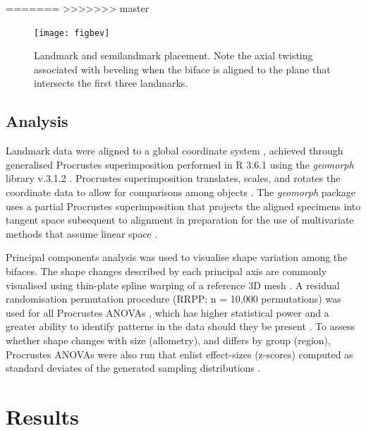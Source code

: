 \documentclass[review]{elsarticle}
\begin{document}
=======
>>>>>>> master
\begin{figure}[ht]\centering
\texttt{[image: figbev]}
\caption{Landmark and semilandmark placement. Note the axial twisting associated with beveling when the biface is aligned to the plane that intersects the first three landmarks.}
\label{fig:fig5}
\end{figure}

\subsection*{Analysis}

Landmark data were aligned to a global coordinate system \citep{RN11622,RN11623,RN11563}, achieved through generalised Procrustes superimposition \citep{RN478} performed in R 3.6.1 \citep{R} using the \textit{geomorph} library v.3.1.2 \citep{RN11530,RN1774}. Procrustes superimposition translates, scales, and rotates the coordinate data to allow for comparisons among objects \citep{RN11564,RN478}. The \textit{geomorph} package uses a partial Procrustes superimposition that projects the aligned specimens into tangent space subsequent to alignment in preparation for the use of multivariate methods that assume linear space \citep{RN1646,RN11563}.

Principal components analysis \citep{RN1746} was used to visualise shape variation among the bifaces. The shape changes described by each principal axis are commonly visualised using thin-plate spline warping of a reference 3D mesh \citep{RN1731,RN479}. A residual randomisation permutation procedure (RRPP; n = 10,000 permutations) was used for all Procrustes ANOVAs \citep{RN1655,RN11775}, which has higher statistical power and a greater ability to identify patterns in the data should they be present \citep{RN1719}. To assess whether shape changes with size (allometry), and differs by group (region), Procrustes ANOVAs \citep{RN1749} were also run that enlist effect-sizes (z-scores) computed as standard deviates of the generated sampling distributions \citep{RN1756}. 

\section*{Results}
\end{document}
